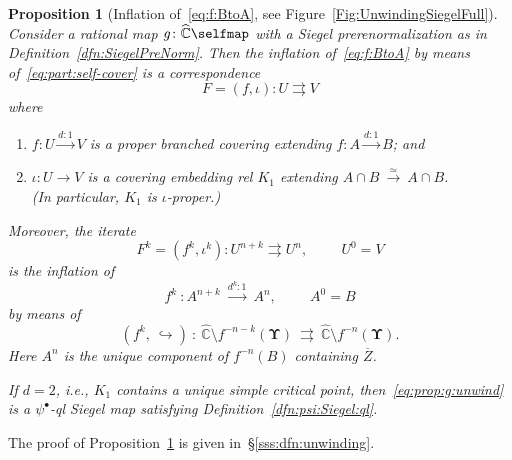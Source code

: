 \documentclass{amsart}
\newcommand{\1}{{\mathbb 1 }}
\newcommand{\bUpsilon}{{\mathbf \Upsilon}}
\newcommand{\wC}{\widehat{\mathbb{C}}}
\newtheorem{prop}[thm]{Proposition}
\theoremstyle{remark}
\numberwithin{equation}{section}
\theoremstyle{definition}
\begin{document}
\begin{prop}[Inflation of~\eqref{eq:f:BtoA}, see Figure~\ref{Fig:UnwindingSiegelFull}]\label{prop:g:unwind} Consider a rational map $g\colon\wC\selfmap$ with a Siegel prerenormalization as in Definition~\ref{dfn:SiegelPreNorm}. Then the inflation  of~\eqref{eq:f:BtoA} by means of~\eqref{eq:part:self-cover} is a correspondence   
\begin{equation}
\label{eq:prop:g:unwind}
F=(f,\iota)\colon U\rightrightarrows V
\end{equation}
where
\begin{enumerate}[label=\text{(\Alph*)},font=\normalfont,leftmargin=*]
\item\label{item:A:prop:g:unwind} $f\colon U\overset{d:1}\longrightarrow V$ is a proper branched covering extending $f\colon A\overset{d:1}\longrightarrow  B$; and 
\item\label{item:B:prop:g:unwind} $\iota\colon U\longrightarrow V$ is a covering embedding rel $K_1$ extending $A\cap B \ \overset{\simeq}{\longrightarrow}\  A\cap B$. \\ (In particular, $K_1$ is $\iota$-proper.)
\end{enumerate}


Moreover, the iterate \[F^k=(f^k,\iota^k)\colon U^{n+k}\rightrightarrows U^n,\hspace{1cm} U^0=V\] is the inflation of \[f^k\ \colon A^{n+k}\ \overset{d^k:1}{\longrightarrow}\ A^n,\hspace{1cm} A^0=B\]
by means of 
\[(f^k,\ \hookrightarrow)\ \colon\ \wC\setminus f^{-n-k}(\bUpsilon) \ \rightrightarrows\ \wC\setminus  f^{-n}(\bUpsilon).\]
Here $A^n$ is the unique component of $f^{-n}(B)$ containing $\overline Z$.


If $d=2$, i.e., $K_1$ contains a unique simple critical point, then~\eqref{eq:prop:g:unwind} is a $\psi^\bullet$-ql Siegel map satisfying Definition~\ref{dfn:psi:Siegel:ql}.
\end{prop}



The proof of Proposition~\ref{prop:g:unwind} is given in~\S\ref{sss:dfn:unwinding}.
\end{document}
